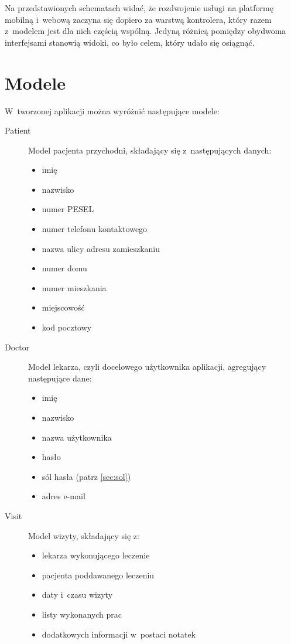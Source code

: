 \documentclass[11pt]{aghdpl}
\begin{document}
Na przedstawionych schematach widać, że rozdwojenie usługi na platformę mobilną i~webową zaczyna się dopiero za warstwą kontrolera, który razem z~modelem jest dla nich częścią wspólną. Jedyną różnicą pomiędzy obydwoma interfejsami stanowią widoki, co było celem, który udało się osiągnąć.

\section{Modele}
\label{sec:modele}

W~tworzonej aplikacji można wyróżnić następujące modele:
\begin{description}
\item[Patient]
	Model pacjenta przychodni, składający się z~następujących danych:
	\begin{itemize}
		\item imię
		\item nazwisko
		\item numer PESEL
		\item numer telefonu kontaktowego
		\item nazwa ulicy adresu zamieszkaniu
		\item numer domu
		\item numer mieszkania
		\item miejscowość
		\item kod pocztowy
	\end{itemize}
\item[Doctor]
	Model lekarza, czyli docelowego użytkownika aplikacji, agregujący następujące dane:
	\begin{itemize}
		\item imię 
		\item nazwisko
		\item nazwa użytkownika
		\item hasło
		\item sól hasła (patrz \ref{sec:sol})
		\item adres e-mail
	\end{itemize}
\item[Visit]
	Model wizyty, składający się z:
	\begin{itemize}
		\item lekarza wykonującego leczenie
		\item pacjenta poddawanego leczeniu
		\item daty i~czasu wizyty
		\item listy wykonanych prac
		\item dodatkowych informacji w~postaci notatek

\end{itemize}
\end{description}
\end{document}
